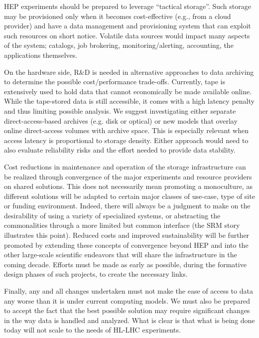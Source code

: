 \documentclass[12pt,a4paper]{article}
\begin{document}
HEP experiments should be prepared to leverage ``tactical storage''.
Such storage may be provisioned only when it becomes cost-effective
(e.g.,
from a cloud provider) and have a data management and provisioning
system that can exploit such resources on short notice. Volatile data
sources would impact many aspects of the system; catalogs, job
brokering, monitoring/alerting, accounting, the applications themselves.

On the hardware side, R\&D is needed in alternative approaches to data
archiving to determine the possible cost/performance trade-offs.
Currently, tape is extensively used to hold data that cannot economically be made available online. While the tape-stored data is still accessible,
it comes with a high latency penalty and thus limiting possible analysis. We suggest investigating either separate direct-access-based archives (e.g.
disk or optical) or new models that overlay online direct-access volumes
with archive space. This is especially relevant when access latency is
proportional to storage density. Either approach would need to also
evaluate reliability risks and the effort needed to provide data
stability.

Cost reductions in maintenance and operation of the storage
infrastructure can be realized through convergence of the major
experiments and resource providers on shared solutions. This does not
necessarily mean promoting a monoculture, as different solutions will be
adapted to certain major classes of use-case, type of site or funding
environment. Indeed, there will always be a judgment to make on the
desirability of using a variety of specialized systems, or abstracting
the commonalities through a more limited but common interface (the SRM
story illustrates this point). Reduced costs and improved sustainability
will be further promoted by extending these concepts of convergence
beyond HEP and into the other large-scale scientific endeavors that
will share the infrastructure in the coming decade. Efforts must be made
as early as possible, during the formative design phases of such
projects, to create the necessary links.

Finally, any and all changes undertaken must not make the ease of access
to data any worse than it is under current computing models. We must
also be prepared to accept the fact that the best possible solution may
require significant changes in the way data is handled and analyzed.
What is clear is that what is being done today will not scale to the
needs of HL-LHC experiments.
\end{document}
